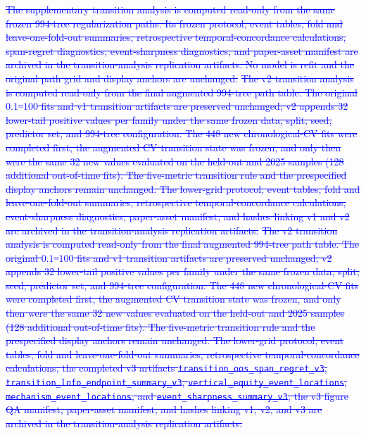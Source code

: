 \documentclass[10pt]{article}
\theoremstyle{definition}
\newcommand{\1}{\mathbf{1}}
\newcommand{\oldtext}[1]{\textcolor{blue}{\sout{#1}}}
\begin{document}
\oldtext{The supplementary transition analysis is computed read-only from the same frozen 994-tree regularization paths. Its frozen protocol, event tables, fold and leave-one-fold-out summaries, retrospective temporal-concordance calculations, span-regret diagnostics, event-sharpness diagnostics, and paper-asset manifest are archived in the transition-analysis replication artifacts. No model is refit and the original path grid and display anchors are unchanged.}
\oldtext{The v2 transition analysis is computed read-only from the final augmented 994-tree path table. The original $0.1$--$100$ fits and v1 transition artifacts are preserved unchanged; v2 appends 32 lower-tail positive values per family under the same frozen data, split, seed, predictor set, and 994-tree configuration. The 448 new chronological-CV fits were completed first, the augmented CV transition state was frozen, and only then were the same 32 new values evaluated on the held-out and 2025 samples (128 additional out-of-time fits). The five-metric transition rule and the prespecified display anchors remain unchanged. The lower-grid protocol, event tables, fold and leave-one-fold-out summaries, retrospective temporal-concordance calculations, event-sharpness diagnostics, paper-asset manifest, and hashes linking v1 and v2 are archived in the transition-analysis replication artifacts.}
\oldtext{The v2 transition analysis is computed read-only from the final augmented 994-tree path table. The original $0.1$--$100$ fits and v1 transition artifacts are preserved unchanged; v2 appends 32 lower-tail positive values per family under the same frozen data, split, seed, predictor set, and 994-tree configuration. The 448 new chronological-CV fits were completed first, the augmented CV transition state was frozen, and only then were the same 32 new values evaluated on the held-out and 2025 samples (128 additional out-of-time fits). The five-metric transition rule and the prespecified display anchors remain unchanged. The lower-grid protocol, event tables, fold and leave-one-fold-out summaries, retrospective temporal-concordance calculations, the completed v3 artifacts \texttt{transition\_oos\_span\_regret\_v3}, \texttt{transition\_lofo\_endpoint\_summary\_v3}, \texttt{vertical\_equity\_event\_locations}, \texttt{mechanism\_event\_locations}, and \texttt{event\_sharpness\_summary\_v3}, the v3 figure QA manifest, paper-asset manifest, and hashes linking v1, v2, and v3 are archived in the transition-analysis replication artifacts.}
\end{document}
